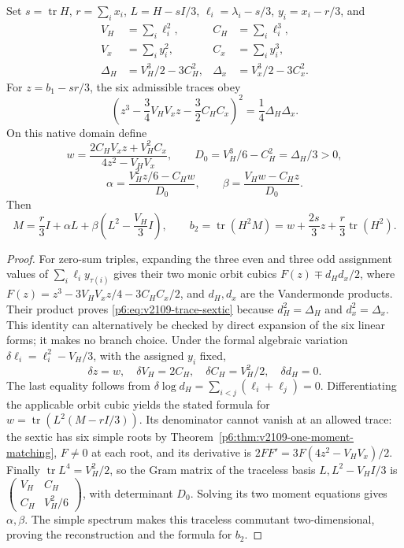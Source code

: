 \documentclass[11pt,a4paper]{article}
\begin{document}
\begin{theorem}
\label{p6:thm:v2109-one-moment-full-return}
Set \(s=\operatorname{tr}H\), \(r=\sum_i x_i\),
\(L=H-sI/3\), \(\ell_i=\lambda_i-s/3\), \(y_i=x_i-r/3\), and
\[
\begin{aligned}
 V_H&=\sum_i\ell_i^2,& C_H&=\sum_i\ell_i^3,\\
 V_x&=\sum_i y_i^2,& C_x&=\sum_i y_i^3,\\
 \Delta_H&=V_H^3/2-3C_H^2,&
 \Delta_x&=V_x^3/2-3C_x^2.
\end{aligned}
\]
For \(z=b_1-sr/3\), the six admissible traces obey
\begin{equation}
 \label{p6:eq:v2109-trace-sextic}
 \left(z^3-\frac34V_HV_xz-\frac32C_HC_x\right)^2
 =\frac14\Delta_H\Delta_x.
\end{equation}
On this native domain define
\[
 w=\frac{2C_HV_xz+V_H^2C_x}{4z^2-V_HV_x},\qquad
 D_0=V_H^3/6-C_H^2=\Delta_H/3>0,
\]
\[
 \alpha=\frac{V_H^2z/6-C_Hw}{D_0},\qquad
 \beta=\frac{V_Hw-C_Hz}{D_0}.
\]
Then
\begin{equation}
 \label{p6:eq:v2109-full-return-reconstruction}
 M=\frac r3 I+\alpha L+\beta\left(L^2-\frac{V_H}{3}I\right),
 \qquad b_2=\operatorname{tr}(H^2M)
 =w+\frac{2s}{3}z+\frac r3\operatorname{tr}(H^2).
\end{equation}
\end{theorem}
\begin{proof}
For zero-sum triples, expanding the three even and three odd assignment
values of \(\sum_i\ell_i y_{\tau(i)}\) gives their two monic orbit cubics
\(F(z)\mp d_Hd_x/2\), where
\(F(z)=z^3-3V_HV_xz/4-3C_HC_x/2\), and \(d_H,d_x\) are the
Vandermonde products.  Their product proves
\eqref{p6:eq:v2109-trace-sextic} because \(d_H^2=\Delta_H\) and
\(d_x^2=\Delta_x\).  This identity can alternatively be checked by direct
expansion of the six linear forms; it makes no branch choice.
Under the formal algebraic variation
\(\delta\ell_i=\ell_i^2-V_H/3\), with the assigned \(y_i\) fixed,
\[
 \delta z=w,\quad \delta V_H=2C_H,\quad
 \delta C_H=V_H^2/2,\quad \delta d_H=0.
\]
The last equality follows from
\(\delta\log d_H=\sum_{i<j}(\ell_i+\ell_j)=0\).
Differentiating the applicable orbit cubic yields the stated formula for
\(w=\operatorname{tr}(L^2(M-rI/3))\).
Its denominator cannot vanish at an allowed trace: the sextic has six
simple roots by Theorem~\ref{p6:thm:v2109-one-moment-matching},
\(F\ne0\) at each root, and its derivative is
\(2FF'=3F(4z^2-V_HV_x)/2\).
Finally \(\operatorname{tr}L^4=V_H^2/2\), so the Gram matrix of the
traceless basis \(L,L^2-V_HI/3\) is
\(\left(\begin{smallmatrix}V_H&C_H\\C_H&V_H^2/6\end{smallmatrix}\right)\),
with determinant \(D_0\).  Solving its two moment equations gives
\(\alpha,\beta\).  The simple spectrum makes this traceless commutant
two-dimensional, proving the reconstruction and the formula for \(b_2\).
\end{proof}
\end{document}

